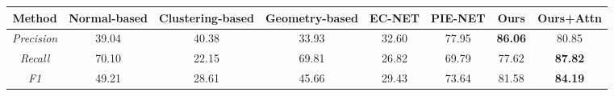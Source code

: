 \documentclass[border=3pt]{standalone}
\begin{document}
\begingroup
\fontsize{11}{12.5}\selectfont
\setlength{\tabcolsep}{7pt}
\setlength{\heavyrulewidth}{0.55pt}
\setlength{\lightrulewidth}{0.45pt}
\renewcommand{\arraystretch}{0.98}
\begin{tabular}{@{}cccccccc@{}}
\toprule
Method & Normal-based & Clustering-based & Geometry-based & EC-NET & PIE-NET & Ours & Ours+Attn \\
\midrule
\textit{Precision} & 39.04 & 40.38 & 33.93 & 32.60 & 77.95 & \textbf{86.06} & 80.85 \\
\textit{Recall}    & 70.10 & 22.15 & 69.81 & 26.82 & 69.79 & 77.62 & \textbf{87.82} \\
\textit{F1}        & 49.21 & 28.61 & 45.66 & 29.43 & 73.64 & 81.58 & \textbf{84.19} \\
\bottomrule
\end{tabular}
\endgroup
\end{document}
